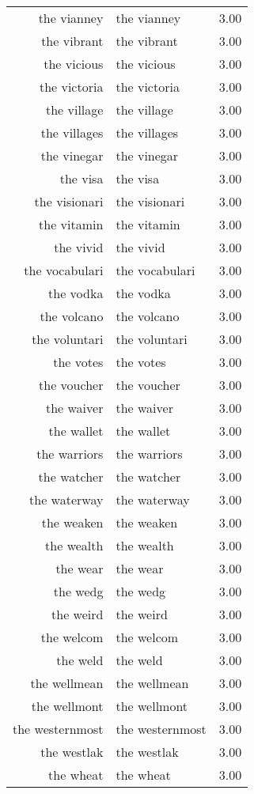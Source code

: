 \begin{table}[ht]
\begin{tabular}{rlr}
  the vianney & the vianney & 3.00 \\ 
  the vibrant & the vibrant & 3.00 \\ 
  the vicious & the vicious & 3.00 \\ 
  the victoria & the victoria & 3.00 \\ 
  the village & the village & 3.00 \\ 
  the villages & the villages & 3.00 \\ 
  the vinegar & the vinegar & 3.00 \\ 
  the visa & the visa & 3.00 \\ 
  the visionari & the visionari & 3.00 \\ 
  the vitamin & the vitamin & 3.00 \\ 
  the vivid & the vivid & 3.00 \\ 
  the vocabulari & the vocabulari & 3.00 \\ 
  the vodka & the vodka & 3.00 \\ 
  the volcano & the volcano & 3.00 \\ 
  the voluntari & the voluntari & 3.00 \\ 
  the votes & the votes & 3.00 \\ 
  the voucher & the voucher & 3.00 \\ 
  the waiver & the waiver & 3.00 \\ 
  the wallet & the wallet & 3.00 \\ 
  the warriors & the warriors & 3.00 \\ 
  the watcher & the watcher & 3.00 \\ 
  the waterway & the waterway & 3.00 \\ 
  the weaken & the weaken & 3.00 \\ 
  the wealth & the wealth & 3.00 \\ 
  the wear & the wear & 3.00 \\ 
  the wedg & the wedg & 3.00 \\ 
  the weird & the weird & 3.00 \\ 
  the welcom & the welcom & 3.00 \\ 
  the weld & the weld & 3.00 \\ 
  the wellmean & the wellmean & 3.00 \\ 
  the wellmont & the wellmont & 3.00 \\ 
  the westernmost & the westernmost & 3.00 \\ 
  the westlak & the westlak & 3.00 \\ 
  the wheat & the wheat & 3.00 \\ 

\end{tabular}
\end{table}
